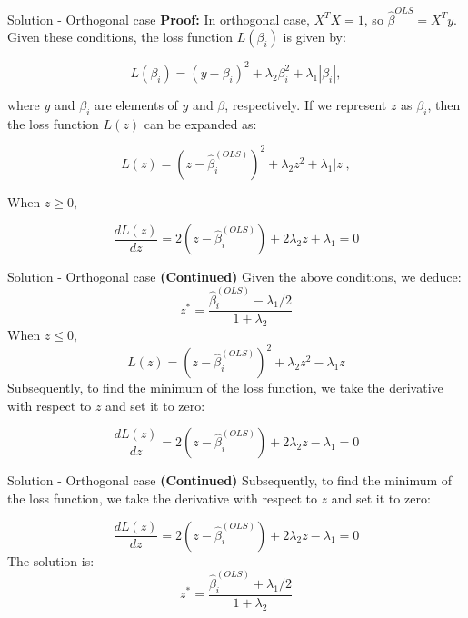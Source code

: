 \begin{frame}{Solution - Orthogonal case}
    \textbf{Proof:} In orthogonal case, $X^TX = 1$, so $\hat{\beta}^{OLS}=X^Ty$.
Given these conditions, the loss function \(L(\beta_i)\) is given by:

$$
L(\beta_i) = (y - \beta_i)^2 + \lambda_2 \beta_i^2 + \lambda_1 |\beta_i|,
$$

where \(y\) and \(\beta_i\) are elements of \(y\) and \(\beta\), respectively. If we represent \(z\) as $\beta_i$, then the loss function \(L(z)\) can be expanded as:

$$
L(z) = (z - \hat{\beta}_i^{(OLS)})^2 + \lambda_2 z^2 + \lambda_1 |z|,
$$

When $z \geq 0$,

$$
\frac{dL(z)}{dz} = 2(z - \hat{\beta}_i^{(OLS)}) + 2\lambda_2 z + \lambda_1 = 0
$$

\end{frame}

\begin{frame}{Solution - Orthogonal case}
    \textbf{(Continued)}  Given the above conditions, we deduce: $$ 
z^* = \frac{\hat{\beta}_i^{(OLS)} - \lambda_1 / 2}{1 + \lambda_2}
$$
When $z \leq 0$,
$$
L(z) = (z - \hat{\beta}_i^{(OLS)})^2 + \lambda_2 z^2 - \lambda_1 z
$$
Subsequently, to find the minimum of the loss function, we take the derivative with respect to \( z \) and set it to zero:

$$
\frac{dL(z)}{dz} = 2(z - \hat{\beta}_i^{(OLS)}) + 2 \lambda_2 z - \lambda_1 = 0
$$
\end{frame}

\begin{frame}{Solution - Orthogonal case}
    \textbf{(Continued)} Subsequently, to find the minimum of the loss function, we take the derivative with respect to \( z \) and set it to zero:

$$
\frac{dL(z)}{dz} = 2(z - \hat{\beta}_i^{(OLS)}) + 2 \lambda_2 z - \lambda_1 = 0
$$
The solution is:
$$
z^* = \frac{\hat{\beta}_i^{(OLS)} + \lambda_1 / 2}{1 + \lambda_2}
$$

\end{frame}


